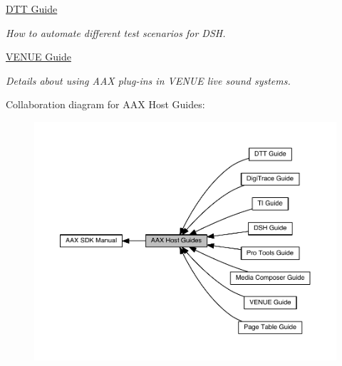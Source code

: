 \begin{DoxyCompactItemize}
\hyperlink{a00366}{D\+T\+T Guide}
\begin{DoxyCompactList}\small\item\em How to automate different test scenarios for D\+S\+H. \end{DoxyCompactList}\item 
\hyperlink{a00377}{V\+E\+N\+U\+E Guide}
\begin{DoxyCompactList}\small\item\em Details about using A\+A\+X plug-\/ins in V\+E\+N\+U\+E live sound systems. \end{DoxyCompactList}\end{DoxyCompactItemize}
Collaboration diagram for A\+A\+X Host Guides\+:
\nopagebreak
\begin{figure}[H]
\begin{center}
\leavevmode
\includegraphics[width=350pt]{a00359}
\end{center}
\end{figure}
